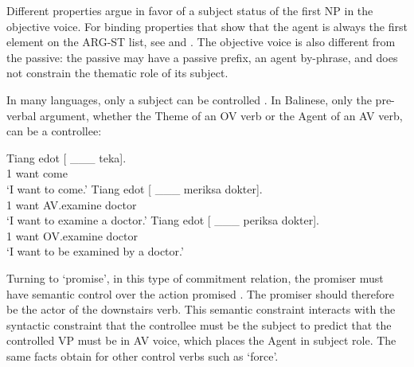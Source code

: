 \documentclass[output=paper]{langsci/langscibook}
\begin{document}
Different properties argue in favor of a subject status of the first NP in the objective voice. For binding properties that show that the agent is always the first element on the ARG-ST list, see  and . The objective voice is also different from the passive: the passive may have a passive prefix, an agent by-phrase, and does not constrain the thematic role of its subject.

In many languages, only a subject
can be controlled \citep{Zaenenetal1985}. In Balinese, only the pre-verbal argument, whether the Theme of an OV verb or the Agent of an AV verb, can be a controllee:

\begin{exe}
\ex \begin{xlist}
\ex 
\gll Tiang edot [ \_\_\_ teka].\\
     1 want     {} {} come\\\hfill\citep[ex 25]{WechslerandArka1998}
\glt `I want to come.'
\ex 
\gll Tiang edot [ \_\_\_  meriksa dokter].\\
     1     want {} {}     AV.examine doctor\\
\glt `I want to examine a doctor.'
\ex 
\gll Tiang edot [ \_\_\_ periksa dokter].\\
     1     want {} {}    OV.examine doctor\\
\glt `I want to be examined by a doctor.'
\end{xlist}
\end{exe}

Turning to  `promise', in this type of commitment relation, the promiser must have semantic control over the action promised \citet{Farkas1988,Kroeger1993,SagandPollard1991}. The promiser should therefore be the actor of the downstairs verb. This semantic constraint interacts with the syntactic constraint that the controllee must be the subject to predict that the controlled VP must be in AV voice, which places the Agent in subject role. The same facts obtain for other control verbs such as  `force'.

\eal
{}
\zl
\end{document}
